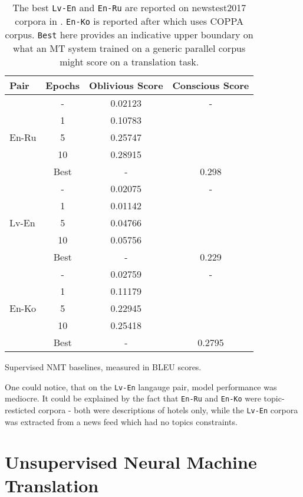 \documentclass[]{article}
\begin{document}
\begin{table}
\begin{center}
\begin{tabular}{ l c c c }
Pair & Epochs & Oblivious Score & Conscious Score \\
\hline
\multirow{5}{4em}{En-Ru} & - & 0.02123 & - \\
& 1 & 0.10783 & \\
& 5 & 0.25747 & \\
& 10 & 0.28915 & \\
& Best & -  & 0.298 \\
\hline
\multirow{5}{4em}{Lv-En} & - & 0.02075 & - \\
& 1 & 0.01142 & \\
& 5 & 0.04766 & \\
& 10 & 0.05756 & \\
& Best & - & 0.229 \\
\hline
\multirow{5}{4em}{En-Ko} & - & 0.02759 & - \\
& 1 & 0.11179 & \\
& 5 & 0.22945 & \\
& 10 & 0.25418 & \\
& Best & - & 0.2795
\end{tabular}
\end{center}
\caption{Supervised NMT baselines, measured in BLEU scores.}
\caption*{\small
The best {\tt Lv-En} and  {\tt En-Ru} are reported on newstest2017 corpora in \cite{bojar2017findings}.
{\tt En-Ko} is reported after \cite{junczys2016coppa} which uses COPPA corpus.
{\tt Best} here provides an indicative upper boundary on what an MT system trained on a generic parallel corpus might score on a translation task.
}
\label{table:baselines}
\end{table}

One could notice, that on the {\tt Lv-En} langauge pair, model performance was mediocre.
It could be explained by the fact that {\tt En-Ru} and {\tt En-Ko} were topic-resticted corpora - both were descriptions of hotels only, while the {\tt Lv-En} corpora was extracted from a news feed which had no topics constraints.

\section{Unsupervised Neural Machine Translation}
\label{sect:unmt}
\end{document}
